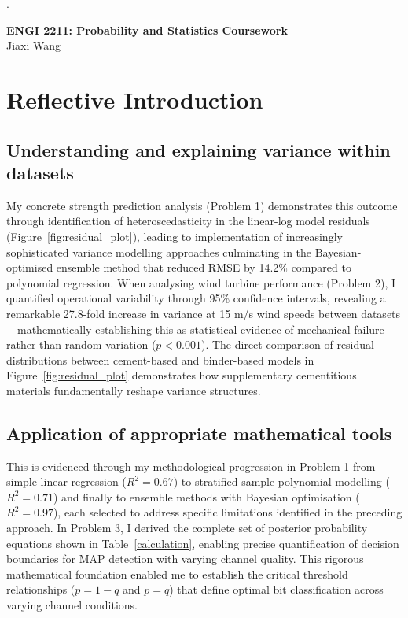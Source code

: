 .\documentclass[a4paper,11pt]{article}
\newcommand{\customtitle}{
    \begin{center}
        \LARGE \textbf{ENGI 2211: Probability and Statistics Coursework} \\
        \vspace{0.2cm}
        \large
        Jiaxi Wang \\
        \vspace{1cm}
    \end{center}
}
\begin{document}
\customtitle



\section*{Reflective Introduction}
 
\subsection*{Understanding and explaining variance within datasets} 
\vspace{-5pt}
My concrete strength prediction analysis (Problem 1) demonstrates this outcome through identification of heteroscedasticity in the linear-log model residuals (Figure~\ref{fig:residual_plot}), leading to implementation of increasingly sophisticated variance modelling approaches culminating in the Bayesian-optimised ensemble method that reduced RMSE by 14.2\% compared to polynomial regression. When analysing wind turbine performance (Problem 2), I quantified operational variability through 95\% confidence intervals, revealing a remarkable 27.8-fold increase in variance at 15 m/s wind speeds between datasets---mathematically establishing this as statistical evidence of mechanical failure rather than random variation ($p<0.001$). The direct comparison of residual distributions between cement-based and binder-based models in Figure~\ref{fig:residual_plot} demonstrates how supplementary cementitious materials fundamentally reshape variance structures.
\vspace{-10pt}
\subsection*{Application of appropriate mathematical tools}
This is evidenced through my methodological progression in Problem 1 from simple linear regression ($R^2=0.67$) to stratified-sample polynomial modelling ($R^2=0.71$) and finally to ensemble methods with Bayesian optimisation ($R^2=0.97$), each selected to address specific limitations identified in the preceding approach. In Problem 3, I derived the complete set of posterior probability equations shown in Table~\ref{calculation}, enabling precise quantification of decision boundaries for MAP detection with varying channel quality. This rigorous mathematical foundation enabled me to establish the critical threshold relationships ($p=1-q$ and $p=q$) that define optimal bit classification across varying channel conditions.
\vspace{-10pt}
\end{document}
